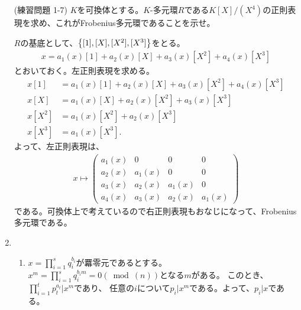 \documentclass[9pt]{ltjsarticle}
\begin{document}
\begin{enumerate}[label=(問題\arabic*)]
  \item[(練習問題 1-7)]
  $K$を可換体とする。$K$-多元環$R$である$K[X]/(X^4)$の正則表現を求め、これがFrobenius多元環であることを示せ。

  $R$の基底として、$\left\{[1],[X],[X^2],[X^3]\right\}$をとる。
  \begin{align}
    x = a_1(x)[1] + a_2(x)[X] + a_3(x)[X^2] + a_4(x)[X^3]
  \end{align}
  とおいておく。左正則表現を求める。
  \begin{align}
    x[1] &= a_1(x)[1] + a_2(x)[X] + a_3(x)[X^2] + a_4(x)[X^3] \\
    x[X] &= a_1(x)[X] + a_2(x)[X^2] + a_3(x)[X^3]\\
    x[X^2] &= a_1(x)[X^2] + a_2(x)[X^3] \\
    x[X^3] &= a_1(x)[X^3].
  \end{align}
  よって、左正則表現は、
  \begin{align}
    x \mapsto
    \begin{pmatrix}
      a_1(x)&0 &0 &0 \\
      a_2(x)&a_1(x) &0 &0 \\
      a_3(x)&a_2(x) &a_1(x) &0 \\
      a_4(x)&a_3(x) &a_2(x) &a_1(x)
    \end{pmatrix}
  \end{align}
  である。可換体上で考えているので右正則表現もおなじになって、Frobenius多元環である。
  \item
  \begin{enumerate}[label=(\arabic*)]
    \item
    $x = \prod_{i=1}^s q_i^{b_i}$が羃零元であるとする。
    $x^m = \prod_{i=1}^s q_i^{b_i m} = 0 (\bmod (n))$となる$m$がある。
    このとき、$\prod_{i=1}^t p_t^{a_t} | x^m$であり、
    任意の$i$について$p_i | x^m$である。よって、$p_i | x$である。


\end{enumerate}
\end{enumerate}
\end{document}
